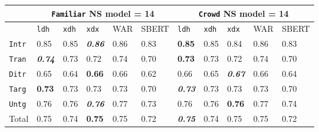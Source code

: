 \documentclass[xcolor={dvipsnames}]{beamer}
\newcommand{\feat}[1]{\textsc{#1}}
\newcommand{\param}[1]{\texttt{#1}}
\begin{document}
\begin{frame}
\small
\begin{table}[htb!]
\begin{center}
\setlength{\tabcolsep}{.35em}
\begin{tabular}{|l||l|l|l||l|l||l|l|l||l|l|}
\hline
 & \multicolumn{5}{c||}{\param{Fam\-il\-iar} NS model = 14} & \multicolumn{5}{c|}{\param{Crowd} NS model = 14} \\
\hline
    		& \param{ldh}	& \param{xdh} &	\param{xdx} & WAR	& {\scriptsize SBERT} & \param{ldh}	& \param{xdh} &	\param{xdx} & WAR	& {\scriptsize SBERT} \\ \hline
\hline
\param{Intr}  & 0.85                   & 0.85 & \textit{\textbf{0.86}} & 0.86 & 0.83 & \textbf{0.85}          & 0.85 & 0.84                   & 0.86 & 0.83 \\ \hline
\param{Tran}  & \textit{\textbf{0.74}} & 0.73 & 0.72                   & 0.74 & 0.70 & \textbf{0.73}          & 0.73 & 0.72                   & 0.74 & 0.70 \\ \hline
\param{Ditr}  & 0.65                   & 0.64 & \textbf{0.66}          & 0.66 & 0.62 & 0.66                   & 0.65 & \textit{\textbf{0.67}} & 0.66 & 0.64 \\ \hline
\hline
\param{Targ}  & \textbf{0.73}          & 0.73 & 0.73                   & 0.73 & 0.70 & \textit{\textbf{0.73}} & 0.73 & 0.73                   & 0.73 & 0.70 \\ \hline
\param{Untg}  & 0.76                   & 0.76 & \textit{\textbf{0.76}} & 0.77 & 0.73 & 0.76          & 0.76 & \textbf{0.76}          & 0.77 & 0.74 \\ \hline
\hline
Total & 0.75                   & 0.74 & \textbf{0.75}          & 0.75 & 0.72 & \textit{\textbf{0.75}} & 0.74 & 0.75                   & 0.75 & 0.72 \\ \hline
\end{tabular}


\end{center}
\end{table}
\end{frame}
\end{document}
